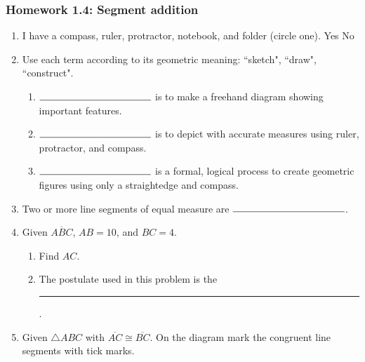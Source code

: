 \documentclass[12pt, oneside]{article}
\begin{document}
\subsubsection*{Homework 1.4: Segment addition}
  \vspace{0.5cm}
  \begin{enumerate}
    \item I have a compass, ruler, protractor, notebook, and folder (circle one). Yes \qquad No

    \item Use each term according to its geometric meaning: ``sketch", ``draw", ``construct".
    \begin{enumerate}
      \item $\rule{4cm}{0.15mm}$ is to make a freehand diagram showing important features. \smallskip
      \item $\rule{4cm}{0.15mm}$ is to depict with accurate measures using ruler, protractor, and compass. \smallskip
      \item $\rule{4cm}{0.15mm}$ is a formal, logical process to create geometric figures using only a straightedge and compass.
    \end{enumerate} \smallskip

  \item Two or more line segments of equal measure are $\rule{4cm}{0.15mm}$.
    \bigskip
  \item Given $\overline{ABC}$, $AB=10$, and $BC=4$.
  \begin{enumerate}
    \item Find ${AC}$.\\[0.75cm]
       \smallskip
    \item The postulate used in this problem is the \rule{6cm}{0.15mm}.
  \end{enumerate}
  \smallskip

  \item Given $\triangle ABC$ with $\overline{AC} \cong \overline{BC}$. On the diagram mark the congruent line segments with tick marks.
  \begin{center}
  \end{center}


\end{enumerate}
\end{document}
